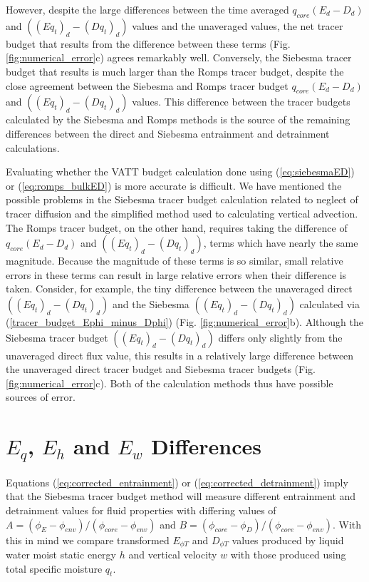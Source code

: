 \documentclass[12pt]{article}
\begin{document}
However, despite the large differences between the time averaged 
$q_{core}(E_d - D_d)$ and $((Eq_t)_d - (Dq_t)_d)$ values and the unaveraged
values, the net tracer budget that results from the difference
between these terms (Fig. \ref{fig:numerical_error}c) agrees remarkably 
well.  Conversely, the Siebesma tracer budget that results is much larger 
than the Romps tracer budget, despite the close agreement between the 
Siebesma and Romps tracer budget $q_{core}(E_d - D_d)$ and 
$((Eq_t)_d - (Dq_t)_d)$ values.  This difference between the tracer budgets
calculated by the Siebesma and Romps methods is the source of the remaining
differences between the direct and Siebesma entrainment and detrainment
calculations.

Evaluating whether the VATT budget calculation done using (\ref{eq:siebesmaED})
or (\ref{eq:romps_bulkED}) is more accurate is difficult.
We have mentioned the possible problems in the Siebesma tracer budget
calculation related to neglect of tracer diffusion and the simplified method 
used to calculating vertical advection.  The Romps tracer budget, on the other hand, requires taking the difference of $q_{core}(E_d - D_d)$ and 
$((Eq_t)_d - (Dq_t)_d)$, terms which have nearly the same magnitude.  
Because the magnitude of these terms is so similar, small relative errors in
these terms can result in large relative errors when their difference is taken.
Consider, for example, the tiny difference between the unaveraged direct 
$((Eq_t)_d - (Dq_t)_d)$ and the Siebesma $((Eq_t)_d - (Dq_t)_d)$ calculated
via (\ref{tracer_budget_Ephi_minus_Dphi}) (Fig. \ref{fig:numerical_error}b).
Although the Siebesma tracer budget $((Eq_t)_d - (Dq_t)_d)$ differs only
slightly from the unaveraged direct flux value, this results in a relatively
large difference between the unaveraged direct tracer budget and Siebesma 
tracer budgets (Fig. \ref{fig:numerical_error}c).  Both of the calculation 
methods thus have possible sources of error.


\section{$E_q$, $E_h$ and $E_w$ Differences}

Equations (\ref{eq:corrected_entrainment}) or (\ref{eq:corrected_detrainment}) 
imply that the Siebesma tracer budget method will measure different entrainment
and detrainment values for fluid properties with differing values of 
$A = (\phi_E - \phi_{env})/(\phi_{core} - \phi_{env})$ and
$B = (\phi_{core} - \phi_D)/(\phi_{core} - \phi_{env})$.  With this in mind 
we compare transformed $E_{\phi T}$ and $D_{\phi T}$ values produced by liquid
water moist static energy $h$ and vertical velocity $w$ with those produced 
using total specific moisture $q_t$.
\end{document}
